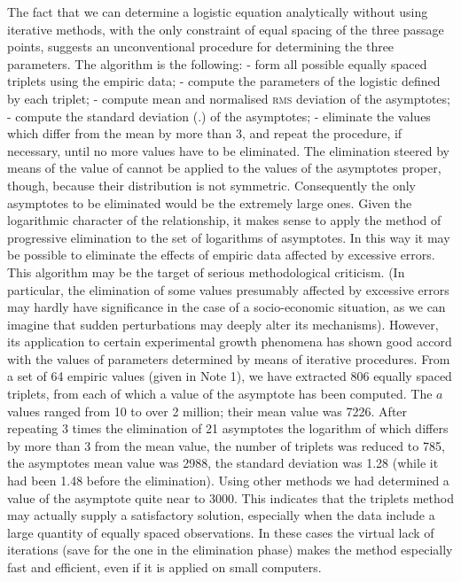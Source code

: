 \documentclass[%
 aip,
 jmp,%
 amsmath,amssymb,
 reprint,%
]{revtex4-1}
\begin{document}
The fact that we can determine a logistic equation analytically without using iterative methods, with the  only constraint of  equal spacing  of the three  passage  points, suggests an unconventional procedure for determining the three parameters. The algorithm is the following:
-	form all possible equally spaced triplets using the empiric data;
-	compute the parameters of the logistic defined by each triplet;
-	compute mean and normalised \textsc{rms} deviation of the asymptotes;
-	compute the standard deviation (.) of the asymptotes;
-	eliminate the values which differ from the mean by more than 3, and repeat  the  procedure,  if necessary, until no more values have to be eliminated.
The elimination steered by means of the value of cannot be applied to the values of the asymptotes proper, though, because their distribution is not symmetric. Consequently the only asymptotes to be eliminated would be the extremely large ones.
Given the logarithmic character of  the relationship, it makes sense to apply the method of progressive elimination to the set of logarithms  of asymptotes.
In this way it may be possible to eliminate the effects of empiric data affected by excessive errors.
This algorithm may be the target of serious methodological criticism. (In particular, the elimination of some values  presumably affected by excessive errors may hardly have significance in the case of a socio-economic situation, as  we  can imagine that sudden perturbations may deeply alter its mechanisms).  However, its application to certain experimental growth phenomena has shown good accord with the values of parameters determined by means of iterative procedures.
From a set of 64 empiric values (given in Note 1), we have extracted 806 equally spaced triplets, from each of which a value of the asymptote has been computed. The $a$ values ranged from 10 to over 2 million; their mean value was 7226.
After repeating 3 times the elimination of 21 asymptotes the logarithm of which differs by more than 3 from the mean value, the number of triplets was reduced to 785, the asymptotes mean value was 2988, the standard deviation was 1.28  (while  it had been  1.48 before  the elimination).
Using other methods we had determined a value of  the asymptote quite near to 3000. This indicates that the  triplets method may actually supply a satisfactory solution, especially when the data include a large quantity of equally spaced observations. In these cases the virtual lack of iterations (save for the one in the elimination phase) makes the method especially fast and  efficient, even if it is  applied on  small computers.
\end{document}
